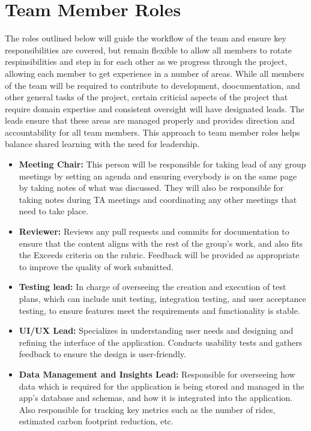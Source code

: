 \documentclass{article}
\begin{document}
\section{Team Member Roles}

The roles outlined below will guide the workflow of the team and ensure key responsibilities are covered, but remain flexible to allow all members to rotate respinsibilities
and step in for each other as we progress through the project, allowing each member to get experience in a number of areas. While all members of the team
will be required to contribute to development, doocumentation, and other general tasks of the project, certain criticial aspects of the project that require 
domain expertise and consistent oversight will have designated leads. The leads ensure that these areas are managed properly and provides direction and accountability for all team members.
This approach to team member roles helps balance shared learning with the need for leadership.
\begin{itemize}
  \item {\bf Meeting Chair:} This person will be responsible for taking lead of any group meetings by setting an agenda and ensuring
        everybody is on the same page by taking notes of what was discussed. They will also be responsible for taking notes during TA meetings
        and coordinating any other meetings that need to take place.
  \item {\bf Reviewer:} Reviews any pull requests and commits for documentation to ensure that the content aligns with the rest of the group's work, 
        and also fits the Exceeds criteria on the rubric. Feedback will be provided as appropriate to improve the quality of work submitted.
  \item {\bf Testing lead:} In charge of overseeing the creation and execution of test plans, which can include unit testing, integration testing, and user acceptance testing, to ensure features meet the requirements and functionality is stable. 
  \item {\bf UI/UX Lead:} Specializes in understanding user needs and designing and refining the interface of the application. Conducts usability tests
        and gathers feedback to ensure the design is user-friendly. 
  \item {\bf Data Management and Insights Lead:} Responsible for overseeing how data which is required for the application is being stored and managed
        in the app's database and schemas, and how it is integrated into the application. Also responsible for tracking key metrics such as the number of rides,
        estimated carbon footprint reduction, etc.
\end{itemize} 
\end{document}
